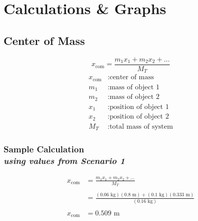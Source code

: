 
\section{Calculations \& Graphs}

\vspace{-0.5cm}
\singlespacing


\subsection{Center of Mass} 

{\centering
\begin{equation}
	x_\text{com} = \frac{m_1x_1 + m_2x_2 + ...}{M_T} 
	\label{eq:COM}
\end{equation}
\begin{align*}
	x_\text{com} &: \text{center of mass} \\
	m_1 &: \text{mass of object 1} \\
	m_2 &: \text{mass of object 2} \\
	x_1 &: \text{position of object 1} \\
	x_2 &: \text{position of object 2} \\
	M_T &: \text{total mass of system}
\end{align*}}

\subsubsection{Sample Calculation \\ {\normalfont \small\textit{using values from Scenario 1}}}

{\centering
\begin{align*}
	x_\text{com} &= \frac{m_1x_1 + m_2x_2 + ...}{M_T} \\ \\
							 &= \frac{(0.06\text{ kg})(0.8\text{ m}) + (0.1\text{ kg})(0.333\text{ m})}{(0.16\text{ kg})} \\ \\ 
	x_\text{com} &= \boxed{0.509 \text{ m}} 
\end{align*}}






